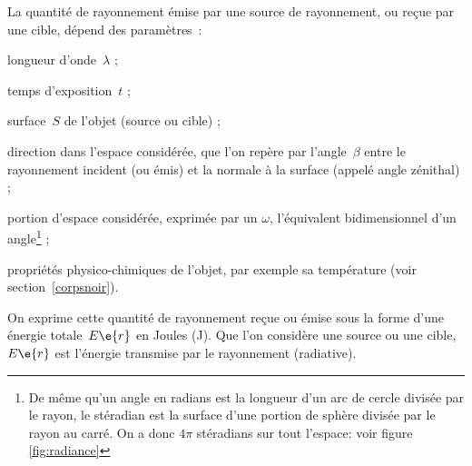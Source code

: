 \sk
La quantité de rayonnement émise par une source de rayonnement, ou reçue par une cible, dépend des paramètres~:
\begin{citemize}
\item longueur d'onde~$\lambda$ ;
\item temps d'exposition~$t$ ;
\item surface~$S$ de l'objet (source ou cible) ;
\item direction dans l'espace considérée, que l'on repère par l'angle~$\beta$ entre le rayonnement incident (ou émis) et la normale à la surface (appelé angle zénithal) ;
\item portion d'espace considérée, exprimée par un  $\omega$, l'équivalent bidimensionnel d'un angle\footnote{De même qu'un angle en radians est la longueur d'un arc de cercle divisée par le rayon, le stéradian est la surface d'une portion de sphère divisée par le rayon au carré. On a donc $4\pi$ stéradians sur tout l'espace: voir figure \ref{fig:radiance}} ;
\item propriétés physico-chimiques de l'objet, par exemple sa température (voir section~\ref{corpsnoir}).
\end{citemize}
On exprime cette quantité de rayonnement reçue ou émise sous la forme d'une énergie totale~$E\e{r}$ en Joules (J). Que l'on considère une source ou une cible, $E\e{r}$ est l'énergie transmise par le rayonnement (radiative).

